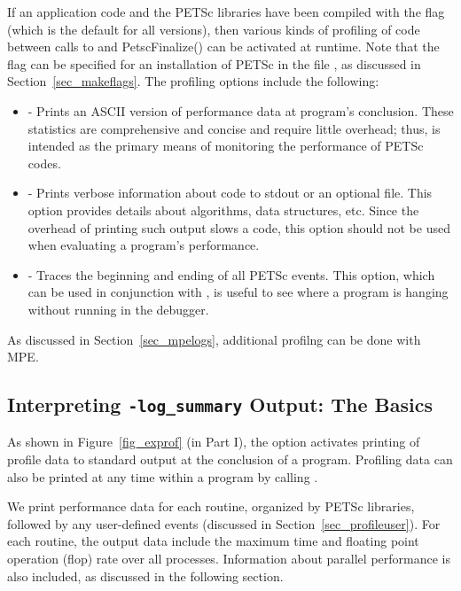 If an application code and the PETSc libraries have been compiled with
the  flag (which is the default for all versions),
then various kinds of profiling of code between calls to  and PetscFinalize() can be 
activated at runtime.  Note that the flag  can be
specified for an installation of PETSc in the file , as discussed in
Section~\ref{sec_makeflags}.  The profiling options include the following:
 
\begin{itemize}
\item {} - Prints an ASCII version of performance data
     at program's conclusion. These statistics are comprehensive and concise
     and require little overhead; thus,  is intended as
     the primary means of monitoring the performance of PETSc codes.
\item {} - Prints verbose information about code to
     stdout or an optional file. This option provides details about algorithms,
     data structures, etc. Since the overhead of printing such output slows a
     code, this option should not be used when evaluating a program's performance.
\item {} - Traces the beginning and ending of all
     PETSc events.  This option, which can be used in conjunction with 
     , is useful to see where a program is hanging
     without running in the debugger.  
\end{itemize}
 As discussed in Section~\ref{sec_mpelogs},
additional profilng can be done with MPE.

\subsection{Interpreting {\tt -log\_summary} Output: The Basics}
\label{sec_ploginfo}

As shown in Figure~\ref{fig_exprof} (in Part I), the option   activates printing of profile
data to standard output at the conclusion of a program.  Profiling
data can also be printed at any time within a program by calling .

We print performance data for each routine, organized by PETSc
libraries, followed by any user-defined events (discussed in
Section~\ref{sec_profileuser}).  For each routine, the output data
include the maximum time and floating point operation (flop) rate over
all processes.  Information about parallel performance is also
included, as discussed in the following section.

